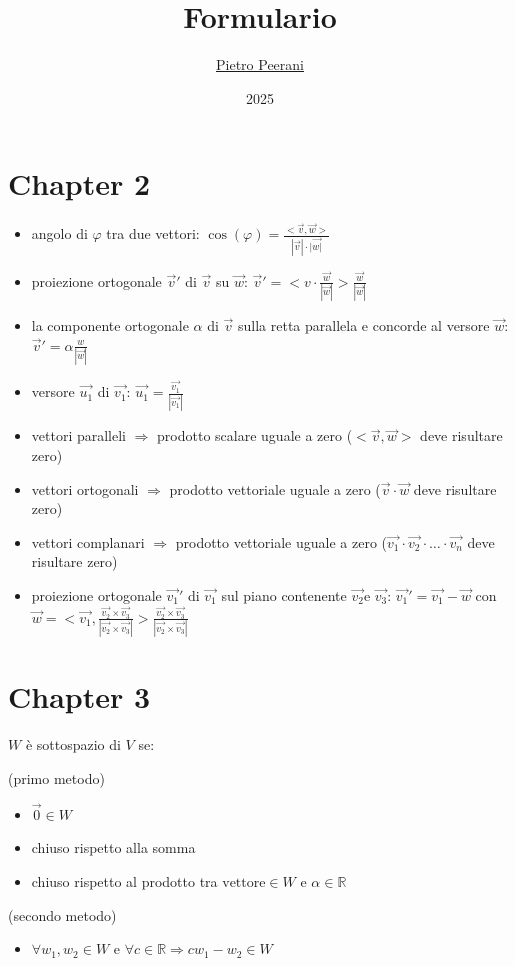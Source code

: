 \documentclass{article}
\title{Formulario \matter}
\author{\href{https://github.com/pietropeerani}{Pietro Peerani}}
\date{2025}
\begin{document}
    
    \maketitle
    \newpage
    \thispagestyle{plain} %
    \newpage

    \section*{Chapter 2}
    \begin{itemize}
        \item angolo di $\varphi$ tra due vettori: $\cos(\varphi) = \frac{<\vec{v}, \vec{w}>}{|\vec{v}|\cdot |\vec{w|}}$
        \item proiezione ortogonale $\vec{v}'$ di $\vec{v}$ su $\vec{w}$: $\vec{v}' = <v\cdot\frac{\vec{w}}{|\vec{w}|}>\frac{\vec{w}}{|\vec{w}|}$
        \item la componente ortogonale $\alpha$ di $\vec{v}$ sulla retta parallela e concorde al versore $\vec{w}$: $\vec{v}' = \alpha \frac{w}{|\vec{w}|}$
        \item versore $\vec{u_1}$ di $\vec{v_1}$: $\vec{u_1} = \frac{\vec{v_1}}{|\vec{v_1}|}$
        \item vettori paralleli $\Rightarrow$ prodotto scalare uguale a zero ($<\vec{v}, \vec{w}>$ deve risultare zero)
        \item vettori ortogonali $\Rightarrow$ prodotto vettoriale uguale a zero ($\vec{v}\cdot\vec{w}$ deve risultare zero)
        \item vettori complanari $\Rightarrow$ prodotto vettoriale uguale a zero ($\vec{v_1}\cdot\vec{v_2}\cdot\dots\cdot\vec{v_n}$ deve risultare zero)
        \item proiezione ortogonale $\vec{v_1}'$ di $\vec{v_1}$ sul piano contenente $\vec{v_2}$e $\vec{v_3}$: $\vec{v_1}' = \vec{v_1}-\vec{w}$ con $\vec{w} = <\vec{v_1}, \frac{\vec{v_2}\times\vec{v_3}}{|\vec{v_2}\times\vec{v_3}|}>\frac{\vec{v_2}\times\vec{v_3}}{|\vec{v_2}\times\vec{v_3}|}$
    \end{itemize}



    \section*{Chapter 3}
    $W$ è sottospazio di $V$ se:

    (primo metodo)
    \begin{itemize}
        \item $\vec{0}\in W$
        \item chiuso rispetto alla somma
        \item chiuso rispetto al prodotto tra $\text{vettore}\in W$ e $\alpha\in\mathbb{R}$
    \end{itemize}

    (secondo metodo)
    \begin{itemize}
        \item $\forall w_1, w_2 \in W \text{ e } \forall c\in\mathbb{R}\Rightarrow cw_1-w_2\in W$
    \end{itemize}
\end{document}
